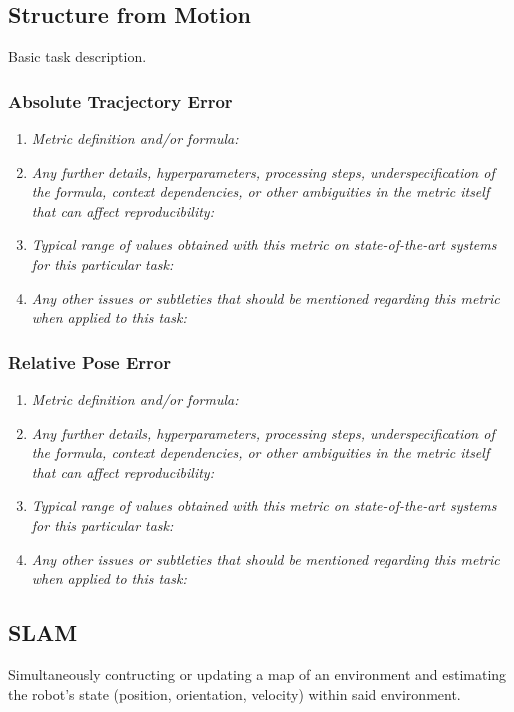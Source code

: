 \documentclass[a4paper,11pt]{article}
\begin{document}
    \subsection{Structure from Motion}
        Basic task description.
        \subsubsection{Absolute Tracjectory Error}
            \begin{enumerate}[label=\alph*.]
                \item \textit{Metric definition and/or formula:}
                \bigskip
                \item \textit{Any further details, hyperparameters, processing steps, underspecification of the formula, context dependencies, or other ambiguities in the metric itself that can affect reproducibility:}
                \bigskip
                \item \textit{Typical range of values obtained with this metric on state-of-the-art systems for this particular task:}
                \bigskip
                \item \textit{Any other issues or subtleties that should be mentioned regarding this metric when applied to this task:}
                \bigskip
            \end{enumerate}
        \subsubsection{Relative Pose Error}
            \begin{enumerate}[label=\alph*.]
                \item \textit{Metric definition and/or formula:}
                \bigskip
                \item \textit{Any further details, hyperparameters, processing steps, underspecification of the formula, context dependencies, or other ambiguities in the metric itself that can affect reproducibility:}
                \bigskip
                \item \textit{Typical range of values obtained with this metric on state-of-the-art systems for this particular task:}
                \bigskip
                \item \textit{Any other issues or subtleties that should be mentioned regarding this metric when applied to this task:}
                \bigskip
            \end{enumerate}
    \subsection{SLAM} \label{slam}
        Simultaneously contructing or updating a map of an environment and estimating the robot's state (position, orientation, velocity) within said environment. 
\end{document}
